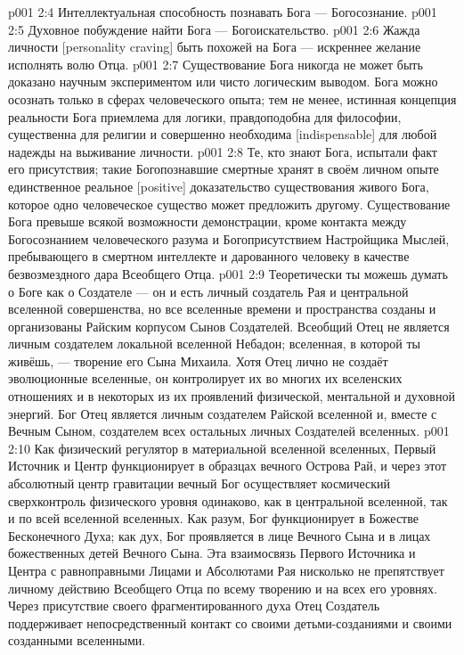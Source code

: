 \vs p001 2:4 \bibnobreakspace Интеллектуальная способность познавать Бога --- Богосознание.
\vs p001 2:5 \bibnobreakspace Духовное побуждение найти Бога --- Богоискательство.
\vs p001 2:6 \bibnobreakspace Жажда личности [personality craving] быть похожей на Бога --- искреннее желание исполнять волю Отца.
\vs p001 2:7 \pc Существование Бога никогда не может быть доказано научным экспериментом или чисто логическим выводом. Бога можно осознать только в сферах человеческого опыта; тем не менее, истинная концепция реальности Бога приемлема для логики, правдоподобна для философии, существенна для религии и совершенно необходима [indispensable] для любой надежды на выживание личности.
\vs p001 2:8 Те, кто знают Бога, испытали факт его присутствия; такие Богопознавшие смертные хранят в своём личном опыте единственное реальное [positive] доказательство существования живого Бога, которое одно человеческое существо может предложить другому. Существование Бога превыше всякой возможности демонстрации, кроме контакта между Богосознанием человеческого разума и Богоприсутствием Настройщика Мыслей, пребывающего в смертном интеллекте и дарованного человеку в качестве безвозмездного дара Всеобщего Отца.
\vs p001 2:9 \pc Теоретически ты можешь думать о Боге как о Создателе --- он и есть личный создатель Рая и центральной вселенной совершенства, но все вселенные времени и пространства созданы и организованы Райским корпусом Сынов Создателей. Всеобщий Отец не является личным создателем локальной вселенной Небадон; вселенная, в которой ты живёшь, --- творение его Сына Михаила. Хотя Отец лично не создаёт эволюционные вселенные, он контролирует их во многих их вселенских отношениях и в некоторых из их проявлений физической, ментальной и духовной энергий. Бог Отец является личным создателем Райской вселенной и, вместе с Вечным Сыном, создателем всех остальных личных Создателей вселенных.
\vs p001 2:10 \pc Как физический регулятор в материальной вселенной вселенных, Первый Источник и Центр функционирует в образцах вечного Острова Рай, и через этот абсолютный центр гравитации вечный Бог осуществляет космический сверхконтроль физического уровня одинаково, как в центральной вселенной, так и по всей вселенной вселенных. Как разум, Бог функционирует в Божестве Бесконечного Духа; как дух, Бог проявляется в лице Вечного Сына и в лицах божественных детей Вечного Сына. Эта взаимосвязь Первого Источника и Центра с равноправными Лицами и Абсолютами Рая нисколько не препятствует  личному действию Всеобщего Отца по всему творению и на всех его уровнях. Через присутствие своего фрагментированного духа Отец Создатель поддерживает непосредственный контакт со своими детьми\hyp{}созданиями и своими созданными вселенными.
